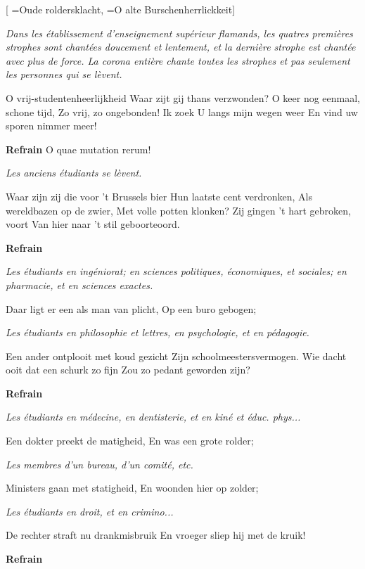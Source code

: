  [
\ititle={Oude roldersklacht},
\tu={O alte Burschenherrlickkeit}]

\emph{Dans les établissement d'enseignement supérieur flamands, les quatres premières strophes sont chantées doucement et lentement, et la dernière strophe est chantée avec plus de force. La corona entière chante toutes les strophes et pas seulement les personnes qui se lèvent.}

\beginverse
O vrij-studentenheerlijkheid
Waar zijt gij thans verzwonden?
O keer nog eenmaal, schone tijd,
Zo vrij, zo ongebonden!
Ik zoek U langs mijn wegen weer
En vind uw sporen nimmer meer!
\endverse

\beginchorus
\textbf{Refrain}
{O quae mutation rerum!}
\endchorus

\emph{ Les anciens étudiants se lèvent.}

\beginverse
Waar zijn zij die voor 't Brussels bier
Hun laatste cent verdronken,
Als wereldbazen op de zwier,
Met volle potten klonken?
Zij gingen 't hart gebroken, voort
Van hier naar 't stil geboorteoord.
\endverse

\beginchorus
\textbf{Refrain}
\endchorus

\emph{Les étudiants en ingéniorat; en sciences politiques, économiques, et sociales; en pharmacie, et en sciences exactes.}

\beginverse
Daar ligt er een als man van plicht,
Op een buro gebogen;

\emph{Les étudiants en philosophie et lettres, en psychologie, et en pédagogie.}

Een ander ontplooit met koud gezicht
Zijn schoolmeestersvermogen.
Wie dacht ooit dat een schurk zo fijn
Zou zo pedant geworden zijn?
\endverse

\beginchorus
\textbf{Refrain}
\endchorus

\emph{Les étudiants en médecine, en dentisterie, et en kiné et éduc. phys...}

\beginverse
Een dokter preekt de matigheid,
En was een grote rolder;

\emph{Les membres d'un bureau, d'un comité, etc.}

Ministers gaan met statigheid,
En woonden hier op zolder;

\emph{Les étudiants en droit, et en crimino...}

De rechter straft nu drankmisbruik
En vroeger sliep hij met de kruik!
\endverse

\beginchorus
\textbf{Refrain}
\endchorus

